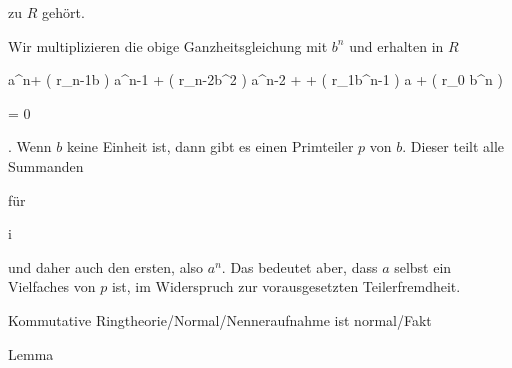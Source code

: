 {{{  }{
}

{    }{
}

{   }{
}

}
{}{}{}
zu $R$ gehört.


Wir multiplizieren die obige Ganzheitsgleichung mit $b^n$ und erhalten in $R$


\mavergleichskettedisp

{\vergleichskette

{ a^n+ \left(  r_{n-1}b  \right)  a^{n-1} + \left(  r_{n-2}b^2  \right) a^{n-2} + \cdots + \left(  r_1b^{n-1}  \right)  a + \left(  r_0 b^n  \right)
}

{ =} { 0
}

{ } {
}

{ } {
}

{ } {
}

}
{}{}{.}
Wenn $b$ keine Einheit ist, dann gibt es einen Primteiler $p$ von $b$. Dieser teilt alle Summanden


 {für}

 {i } {}

 {} {} {} {}
und daher auch den ersten, also $a^n$. Das bedeutet aber, dass $a$ selbst ein Vielfaches von $p$ ist, im Widerspruch zur vorausgesetzten Teilerfremdheit.


}



{Kommutative Ringtheorie/Normal/Nenneraufnahme ist normal/Fakt}

{Lemma}

{}

{


\faktsituation {}



\faktzusatz {}

\faktzusatz {}


 }

